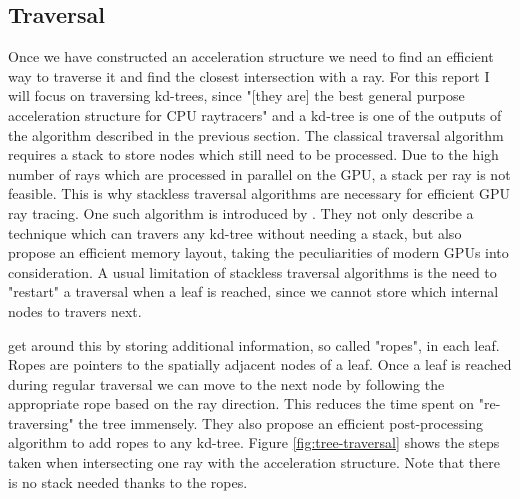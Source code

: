 \documentclass{ACGSeminar}
\begin{document}
\subsection{Traversal}
Once we have constructed an acceleration structure we need to find an efficient way to traverse it and find the closest intersection with a ray. For this report I will focus on traversing kd-trees, since "[they are] the best general purpose acceleration structure for CPU raytracers" \cite{Foley:2005} and a kd-tree is one of the outputs of the algorithm described in the previous section.
The classical traversal algorithm requires a stack to store nodes which still need to be processed. Due to the high number of rays which are processed in parallel on the GPU, a stack per ray is not feasible. This is why stackless traversal algorithms are necessary for efficient GPU ray tracing. One such algorithm is introduced by \citet{popov2007stackless}. They not only describe a technique which can travers any kd-tree without needing a stack, but also propose an efficient memory layout, taking the peculiarities of modern GPUs into consideration. A usual limitation of stackless traversal algorithms is the need to "restart" a traversal when a leaf is reached, since we cannot store which internal nodes to travers next.

\citet{popov2007stackless} get around this by storing additional information, so called "ropes", in each leaf. Ropes are pointers to the spatially adjacent nodes of a leaf. Once a leaf is reached during regular traversal we can move to the next node by following the appropriate rope based on the ray direction. This reduces the time spent on "re-traversing" the tree immensely. They also propose an efficient post-processing algorithm to add ropes to any kd-tree. Figure \ref{fig:tree-traversal} shows the steps taken when intersecting one ray with the acceleration structure. Note that there is no stack needed thanks to the ropes.
\end{document}
